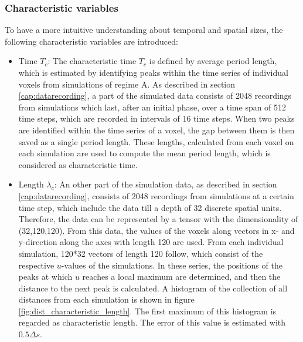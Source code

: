 
\subsubsection*{Characteristic variables}
To have a more intuitive understanding about temporal and spatial sizes, the following characteristic variables are introduced:

\begin{itemize}
    \item Time $T_c$: The characteristic time $T_c$ is defined by average period length, which is estimated by identifying peaks within the time series of individual voxels from simulations of regime A. As described in section \ref{cap:datarecording}, a part of the simulated data consists of 2048 recordings from simulations which last, after an initial phase, over a time span of 512 time steps, which are recorded in intervals of 16 time steps. When two peaks are identified within the time series of a voxel, the gap between them is then saved as a single period length. These lengths, calculated from each voxel on each simulation are used to compute the mean period length, which is considered as characteristic time.
    \item Length $\lambda_c$: An other part of the simulation data, as described in section \ref{cap:datarecording}, consists of 2048 recordings from simulations at a certain time step, which include the data till a depth of 32 discrete spatial units. Therefore, the data can be represented by a tensor with the dimensionality of (32,120,120). 
    From this data, the values of the voxels along vectors in x- and y-direction along the axes with length 120 are used. From each individual simulation, 120*32 vectors of length 120 follow, which consist of the respective $u$-values of the simulations. In these series, the positions of the peaks at which $u$ reaches a local maximum are determined, and then the distance to the next peak is calculated. A histogram of the collection of all distances from each simulation is shown in figure \ref{fig:dist_characteristic_length}. The first maximum of this histogram is regarded as characteristic length. The error of this value is estimated with $0.5\Delta s$.
\end{itemize}

